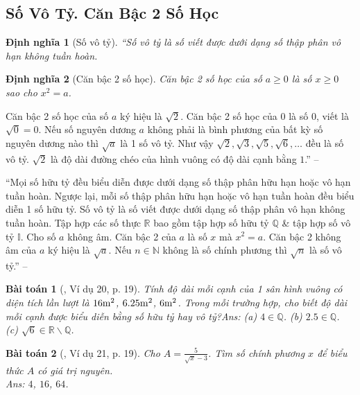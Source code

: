\documentclass{article}
\numberwithin{equation}{section}
\newtheorem{dinhnghia}{Định nghĩa}[section]
\newtheorem{baitoan}{Bài toán}
\begin{document}
\subsection{Số Vô Tỷ. Căn Bậc 2 Số Học}

\begin{dinhnghia}[Số vô tỷ]
	``\emph{Số vô tỷ} là số viết được dưới dạng số thập phân vô hạn không tuần hoàn.
\end{dinhnghia}

\begin{dinhnghia}[Căn bậc 2 số học]
	\emph{Căn bậc 2 số học} của số $a\ge 0$ là số $x\ge 0$ sao cho $x^2 = a$.
\end{dinhnghia}
Căn bậc 2 số học của số $a$ ký hiệu là $\sqrt{2}$. Căn bậc 2 số học của $0$ là số $0$, viết là $\sqrt{0} = 0$. Nếu số nguyên dương $a$ không phải là bình phương của bất kỳ số nguyên dương nào thì $\sqrt{a}$ là 1 số vô tỷ. Như vậy $\sqrt{2},\sqrt{3},\sqrt{5},\sqrt{6},\ldots$ đều là số vô tỷ. $\sqrt{2}$ là độ dài đường chéo của hình vuông có độ dài cạnh bằng $1$.'' -- \cite[Chap. 2, \S1, p. 19]{Tuyen_Toan_7}

``Mọi số hữu tỷ đều biểu diễn được dưới dạng số thập phân hữu hạn hoặc vô hạn tuần hoàn. Ngược lại, mỗi số thập phân hữu hạn hoặc vô hạn tuần hoàn đều biểu diễn 1 số hữu tỷ. Số vô tỷ là số viết được dưới dạng số thập phân vô hạn không tuần hoàn. Tập hợp các số thực $\mathbb{R}$ bao gồm tập hợp số hữu tỷ $\mathbb{Q}$ \& tập hợp số vô tỷ $\mathbb{I}$. Cho số $a$ không âm. Căn bậc 2 của $a$ là số $x$ mà $x^2 = a$. Căn bậc 2 không âm của $a$ ký hiệu là $\sqrt{a}$. Nếu $n\in\mathbb{N}$ không là số chính phương thì $\sqrt{n}$ là số vô tỷ.'' -- \cite[\S7]{Binh_Toan_7_tap_1}

\begin{baitoan}[\cite{Tuyen_Toan_7}, Ví dụ 20, p. 19]
	Tính độ dài mỗi cạnh của 1 sân hình vuông có diện tích lần lượt là $16{\rm m}^2$, $6.25{\rm m}^2$, $6{\rm m}^2$. Trong mỗi trường hợp, cho biết độ dài mỗi cạnh được biểu diễn bằng số hữu tỷ hay vô tỷ?\hfill\textsf{Ans:} (a) $4\in\mathbb{Q}$. (b) $2.5\in\mathbb{Q}$. (c) $\sqrt{6}\in\mathbb{R}\backslash\mathbb{Q}$.
\end{baitoan}

\begin{baitoan}[\cite{Tuyen_Toan_7}, Ví dụ 21, p. 19]
	Cho $A = \frac{5}{\sqrt{x} - 3}$. Tìm số chính phương $x$ để biểu thức $A$ có giá trị nguyên.\\\mbox{}\hfill\textsf{Ans:} $4$, $16$, $64$.
\end{baitoan}
\end{document}
